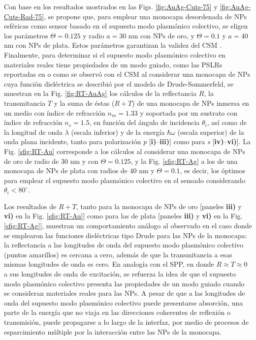 Con base en los resultados mostrados en las Figs. \ref{fig:AuAg-Cuts-75} y \ref{fig:AuAg-Cuts-Rad-75}, se propone que, para emplear una monocapa desordenada de NPs esféricas como sensor basado en el supuesto modo plasmónico colectivo, se eligen los parámetros $\Theta=0.125$ y radio $a=30$ nm con NPs de oro, y $\Theta=0.1$ y $a=40$ nm con NPs de plata. Estos parámetros garantizan la validez del CSM \cite{garcia2012multiple}. Finalmente, para determinar si el supuesto modo plasmónico colectivo en materiales reales tiene propiedades de un modo guiado, como las PSLRs reportadas en \cite{kabashin2009plasmonic} o como se observó con el CSM al considerar una monocapa de NPs cuya función dieléctrica se describió por el modelo de Drude-Sommerfeld, se  muestran en la Fig. \ref{fig:RT-AuAg}  los cálculos de la reflectancia $R$, la transmitancia $T$ y la suma de éstas ($R+T$) de una monocapa de NPs inmersa en un medio con índice de refracción $n_m=1.33$ y soportada por un sustrato con índice de refracción $n_s=1.5$, en función del ángulo de incidencia $\theta_i$, así como de la longitud de onda $\lambda$ (escala inferior) y de la energía  $\hbar\omega$ (escala superior) de la onda plana incidente, tanto para polarización \emph{p}  [\textbf{i)}--\textbf{iii)}] como para \emph{s} [\textbf{iv)}--\textbf{vi)}]. La Fig. \ref{sfig:RT-Au} corresponde a los cálculos al considerar una monocapa de NPs de oro de radio de $30$ nm y con $\Theta=0.125$, y la  Fig. \ref{sfig:RT-Ag} a los de una monocapa de NPs de plata con radios de $40$ nm y $\Theta=0.1$, es decir, los óptimos para emplear el supuesto modo plasmónico colectivo en el sensado considerando $\theta_i<80^\circ$.

Los resultados de $R+T$, tanto para la monocapa de NPs de oro [paneles \textbf{iii)} y \textbf{vi)} en la Fig. \ref{sfig:RT-Au}] como para las de plata [paneles \textbf{iii)} y \textbf{vi)} en la Fig. \ref{sfig:RT-Ag}], muestran un comportamiento análogo al observado en el caso donde se emplearon las funciones dieléctricas tipo Drude para las NPs de la monocapa: la reflectancia a las longitudes de onda del supuesto modo plasmónico colectivo (puntos amarillos) es cercana a cero, además de que la transmitancia a esas mismas longitudes de onda es cero. En analogía con el SPP, en donde $R\approx T\approx 0$ a sus longitudes de onda de excitación, se refuerza la idea de que el supuesto modo plasmónico colectivo presenta las propiedades de un modo guiado cuando se consideran materiales reales para las NPs. A pesar de que a las longitudes de onda del supuesto modo plasmónico colectivo puede presentarse absorción, una parte de la energía que no viaja en las direcciones coherentes de reflexión o transmisión, puede propagarse a lo largo de la interfaz, por medio de procesos de esparcimiento múltiple por la interacción entre las NPs de la monocapa.

